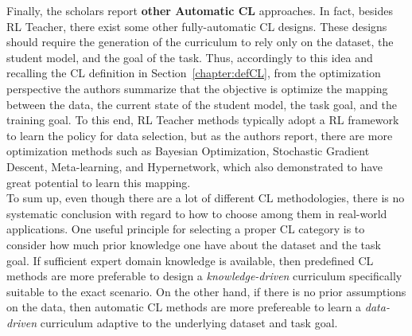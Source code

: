 Finally, the scholars report \textbf{other Automatic CL} approaches. In fact, besides RL Teacher,
there exist some other fully-automatic CL designs. These designs should require the generation of the 
curriculum to rely only on the dataset, the student model, and the goal of the task.
Thus, accordingly to this idea and recalling the CL definition in Section~\ref{chapter:defCL}, from the optimization
perspective the authors summarize that the objective is optimize the mapping between the data, the current state 
of the student model, the task goal, and the training goal. To this end, RL Teacher methods typically adopt a RL framework to learn 
the policy for data selection, but as the authors report, there are more optimization methods 
such as Bayesian Optimization, Stochastic Gradient Descent, Meta-learning, and Hypernetwork, which also demonstrated to have great potential to learn 
this mapping.\\
\newline
To sum up, even though there are a lot of different CL methodologies, there is no systematic conclusion 
with regard to how to choose among them in real-world applications. One useful principle for selecting 
a proper CL category is to consider how much prior knowledge one have about the dataset and the task goal.
If sufficient expert domain knowledge is available, then predefined CL methods are more preferable to design a \textit{knowledge-driven} curriculum 
specifically suitable to the exact scenario. On the other hand, if there is no prior assumptions on the data, then 
automatic CL methods are more prefereable to learn a \textit{data-driven} curriculum adaptive to the underlying dataset and task goal.

